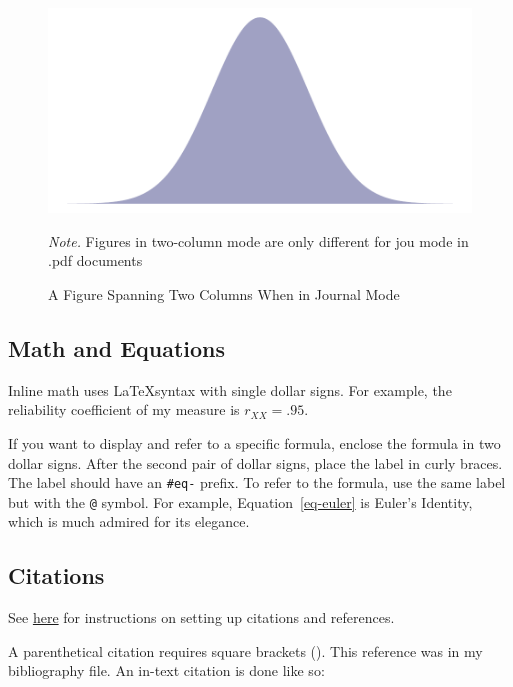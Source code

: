 \documentclass[
  jou,
  floatsintext,
  longtable,
  nolmodern,
  notxfonts,
  notimes,
  colorlinks=true,linkcolor=blue,citecolor=blue,urlcolor=blue]{apa7}
\begin{document}
\begin{figure}[!htbp]

{\caption{{A Figure Spanning Two Columns When in Journal
Mode}{\label{fig-twocolumn}}}}

\begin{center}
\includegraphics{example_files/figure-pdf/fig-twocolumn-1.pdf}
\end{center}

{\noindent \emph{Note.} Figures in two-column mode are only different
for jou mode in .pdf documents}

\end{figure}

\subsection{Math and Equations}\label{math-and-equations}

Inline math uses \LaTeX syntax with single dollar signs. For example,
the reliability coefficient of my measure is \(r_{XX}=.95\).

If you want to display and refer to a specific formula, enclose the
formula in two dollar signs. After the second pair of dollar signs,
place the label in curly braces. The label should have an \texttt{\#eq-}
prefix. To refer to the formula, use the same label but with the
\texttt{@} symbol. For example, Equation~\ref{eq-euler} is Euler's
Identity, which is much admired for its elegance.

\subsection{Citations}\label{citations}

See
\href{https://quarto.org/docs/authoring/footnotes-and-citations.html}{here}
for instructions on setting up citations and references.

A parenthetical citation requires square brackets
(). This
reference was in my bibliography file. An in-text citation is done like
so:
\end{document}
